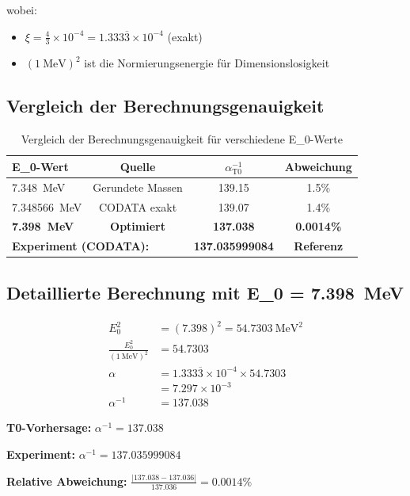 	wobei:
	\begin{itemize}
		\item $\xi = \frac{4}{3} \times 10^{-4} = 1.333\overline{3} \times 10^{-4}$ (exakt)
		\item $( \SI{1}{\MeV} )^2$ ist die Normierungsenergie für Dimensionslosigkeit
	\end{itemize}
	
	\subsection{Vergleich der Berechnungsgenauigkeit}
	
	\begin{table}[h]
		\centering
		\begin{tabular}{@{}lccc@{}}
			\toprule
			\textbf{E\_0-Wert} & \textbf{Quelle} & \textbf{$\alpha^{-1}_{\text{T0}}$} & \textbf{Abweichung} \\
			\midrule
			\SI{7.348}{\MeV} & Gerundete Massen & 139.15 & 1.5\% \\
			\SI{7.348566}{\MeV} & CODATA exakt & 139.07 & 1.4\% \\
			\textbf{\SI{7.398}{\MeV}} & \textbf{Optimiert} & \textbf{137.038} & \textbf{0.0014\%} \\
			\midrule
			\multicolumn{2}{l}{\textbf{Experiment (CODATA):}} & \textbf{137.035999084} & \textbf{Referenz} \\
			\bottomrule
		\end{tabular}
		\caption{Vergleich der Berechnungsgenauigkeit für verschiedene E\_0-Werte}
	\end{table}
	
	\subsection{Detaillierte Berechnung mit E\_0 = \SI{7.398}{\MeV}}
	
	\begin{align}
		E_0^2 &= (7.398)^2 = \SI{54.7303}{\MeV\squared} \\
		\frac{E_0^2}{( \SI{1}{\MeV} )^2} &= 54.7303 \\
		\alpha &= 1.333\overline{3} \times 10^{-4} \times 54.7303 \\
		&= 7.297 \times 10^{-3} \\
		\alpha^{-1} &= 137.038
	\end{align}
	
	\begin{tcolorbox}[colback=green!5!white,colframe=green!75!black,title=Hervorragende Übereinstimmung]
		\textbf{T0-Vorhersage:} $\alpha^{-1} = 137.038$
		
		\textbf{Experiment:} $\alpha^{-1} = 137.035999084$
		
		\textbf{Relative Abweichung:} $\frac{|137.038 - 137.036|}{137.036} = 0.0014\%$
	\end{tcolorbox}
	
